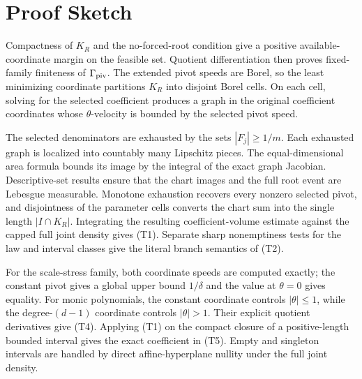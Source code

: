 \section{Proof Sketch}

Compactness of $K_R$ and the no-forced-root condition give a positive
available-coordinate margin on the feasible set.  Quotient differentiation
then proves fixed-family finiteness of $\Gamma_{\rm piv}$.  The extended
pivot speeds are Borel, so the least minimizing coordinate partitions $K_R$
into disjoint Borel cells.  On each cell, solving for the selected coefficient
produces a graph in the original coefficient coordinates whose
$\theta$-velocity is bounded by the selected pivot speed.

The selected denominators are exhausted by the sets
$|F_j|\geq1/m$.  Each exhausted graph is localized into countably many
Lipschitz pieces.  The equal-dimensional area formula bounds its image by
the integral of the exact graph Jacobian.  Descriptive-set results ensure
that the chart images and the full root event are Lebesgue measurable.
Monotone exhaustion recovers every nonzero selected pivot, and disjointness
of the parameter cells converts the chart sum into the single length
$|I\cap K_R|$.  Integrating the resulting coefficient-volume estimate
against the capped full joint density gives \textup{(T1)}.  Separate sharp
nonemptiness tests for the law and interval classes give the literal branch
semantics of \textup{(T2)}.

For the scale-stress family, both coordinate speeds are computed exactly;
the constant pivot gives a global upper bound $1/\delta$ and the value at
$\theta=0$ gives equality.  For monic polynomials, the constant coordinate
controls $|\theta|\leq1$, while the degree-$(d-1)$ coordinate controls
$|\theta|>1$.  Their explicit quotient derivatives give \textup{(T4)}.
Applying \textup{(T1)} on the compact closure of a positive-length bounded
interval gives the exact coefficient in \textup{(T5)}.  Empty and singleton
intervals are handled by direct affine-hyperplane nullity under the full
joint density.
